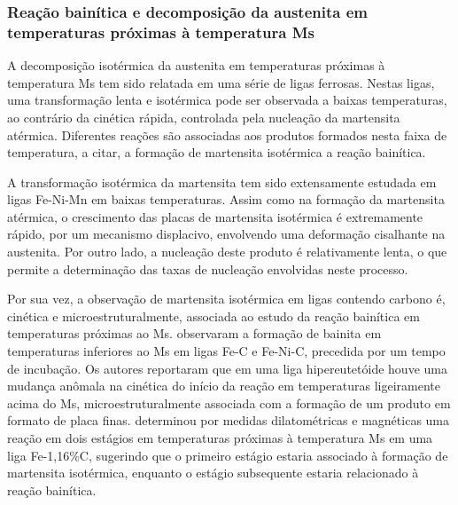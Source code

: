 

\subsubsection{Rea\c{c}\~{a}o bainítica e decomposi\c{c}\~{a}o da austenita em temperaturas pr\'{o}ximas \`{a} temperatura Ms}

\label{subsec:decompMs}

A decomposição isotérmica da austenita em temperaturas próximas à temperatura Ms tem sido relatada em uma série de ligas ferrosas. Nestas ligas, uma transformação lenta e isotérmica pode ser observada a baixas temperaturas, ao contrário da cinética rápida, controlada pela nucleação da martensita atérmica. Diferentes reações são associadas aos produtos formados nesta faixa de temperatura, a citar, a formação de martensita isotérmica a reação bainítica.

A transformação isotérmica da martensita tem sido extensamente estudada em ligas Fe-Ni-Mn em baixas temperaturas\cite{Kaufman1958,Pati1969}. Assim como na formação da martensita atérmica, o crescimento das placas de martensita isotérmica é extremamente rápido, por um mecanismo displacivo, envolvendo uma deformação cisalhante na austenita. Por outro lado, a nucleação deste produto é relativamente lenta, o que permite a determinação das taxas de nucleação envolvidas neste processo\cite{Pati1969}. 

Por sua vez, a observação de martensita isotérmica em ligas contendo carbono é, cinética e microestruturalmente, associada ao estudo da reação bainítica em temperaturas próximas ao Ms.  observaram a formação de bainita em temperaturas inferiores ao Ms em ligas Fe-C e Fe-Ni-C, precedida por um tempo de incubação. Os autores reportaram que em uma liga hipereutetóide houve uma mudança anômala na cinética do início da reação em temperaturas ligeiramente acima do Ms, microestruturalmente associada com a formação de um produto em formato de placa finas.  determinou por medidas dilatométricas e magnéticas uma reação em dois estágios em temperaturas próximas à temperatura Ms em uma liga Fe-1,16\%C, sugerindo que o primeiro estágio estaria associado à formação de martensita isotérmica, enquanto o estágio subsequente estaria relacionado à reação bainítica.

